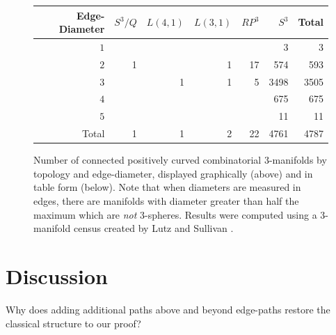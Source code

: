 \documentclass[12pt]{article}
\begin{document}
\begin{figure}
    \begin{center}
    {
	    \setlength\fboxsep{15pt}
		\setlength\fboxrule{0pt}
    }
    \renewcommand{\arraystretch}{1.2}
	\begin{tabular} {| r | r | r | r | r | r | r |}	
		\hline
		Edge-Diameter & $S^{3}/Q$ & $L(4,1)$ & $L(3,1)$ & $RP^{3}$ & $S^{3}$ & Total \\
		\hline
		\hline
		$1$ &  &  &  &   &3    & 3    \\
		$2$ & 1&  &1 &17 &574  & 593  \\
		$3$ &  &1 &1 &5  &3498 & 3505 \\
		$4$ &  &  &  &   &675  & 675   \\
		$5$ &  &  &  &   &11   & 11   \\
		\hline
		Total&1 &1 &2 &22   &4761   &4787  \\
		\hline
	\end{tabular}
    \end{center}
    \caption{Number of connected positively curved combinatorial 3-manifolds by topology and edge-diameter, displayed graphically (above) and in table form (below). Note that when diameters are measured in edges, there are manifolds with diameter greater than half the maximum which are {\em not} 3-spheres. Results were computed using a 3-manifold census created by Lutz and Sullivan \cite{LutzSul_unpub}.}
	\label{fig:type_statistics_edges}
\end{figure}

\section{Discussion}
Why does adding additional paths above and beyond edge-paths restore the classical structure to our proof?
\end{document}
